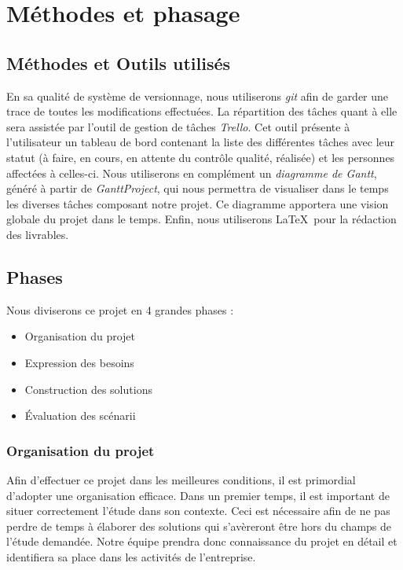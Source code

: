 \chapter{Méthodes et phasage}


\section{Méthodes et Outils utilisés}

En sa qualité de système de versionnage, nous utiliserons \textit{git} afin de garder une trace de toutes les modifications effectuées.
La répartition des tâches quant à elle sera assistée par l'outil de gestion de tâches \textit{Trello}. Cet outil présente à l'utilisateur un tableau de bord contenant la liste des différentes tâches avec leur statut (à faire, en cours, en attente du contrôle qualité, réalisée) et les personnes affectées à celles-ci.
Nous utiliserons en complément un \textit{diagramme de Gantt}, généré à partir de \textit{GanttProject}, qui nous permettra de visualiser dans le temps les diverses tâches composant notre projet. Ce diagramme apportera une vision globale du projet dans le temps.
Enfin, nous utiliserons \LaTeX \ pour la rédaction des livrables.


\section{Phases}

Nous diviserons ce projet en 4 grandes phases :

\begin{itemize}
 \item Organisation du projet
 \item Expression des besoins
 \item Construction des solutions
 \item Évaluation des scénarii
\end{itemize} 

\subsection{Organisation du projet}

Afin d'effectuer ce projet dans les meilleures conditions, il est primordial d'adopter une organisation efficace.
Dans un premier temps, il est important de situer correctement l'étude dans son contexte. 
Ceci est nécessaire afin de ne pas perdre de temps à élaborer des solutions qui s'avèreront être hors du champs de l'étude demandée.
Notre équipe prendra donc connaissance du projet en détail et identifiera sa place dans les activités de l'entreprise.

